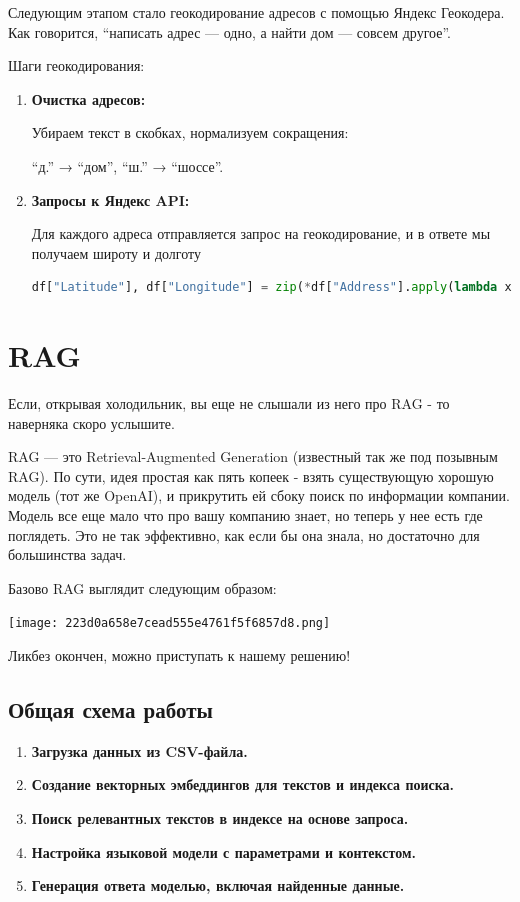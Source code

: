 \documentclass{article}
\begin{document}
Следующим этапом стало геокодирование адресов с помощью Яндекс Геокодера. Как говорится, “написать адрес — одно, а найти дом — совсем другое”.

Шаги геокодирования:
\begin{enumerate}
    \item \textbf{Очистка адресов:}

    Убираем текст в скобках, нормализуем сокращения:

    “д.” → “дом”, “ш.” → “шоссе”.
    
    \item \textbf{Запросы к Яндекс API:}

    Для каждого адреса отправляется запрос на геокодирование, и в ответе мы получаем широту и долготу

        \begin{lstlisting}[language=Python]
df["Latitude"], df["Longitude"] = zip(*df["Address"].apply(lambda x: get_coordinates(x, api_key)))
        \end{lstlisting}
\end{enumerate}







\newpage

\section{RAG}
Если, открывая холодильник, вы еще не слышали из него про RAG - то наверняка скоро услышите.

RAG — это Retrieval-Augmented Generation (известный так же под позывным RAG). По сути, идея простая как пять копеек - взять существующую хорошую модель (тот же OpenAI), и прикрутить ей сбоку поиск по информации компании. Модель все еще мало что про вашу компанию знает, но теперь у нее есть где поглядеть. Это не так эффективно, как если бы она знала, но достаточно для большинства задач.

Базово RAG выглядит следующим образом:

\texttt{[image: 223d0a658e7cead555e4761f5f6857d8.png]}

Ликбез окончен, можно приступать к нашему решению!

\subsection*{Общая схема работы}
\begin{enumerate}
    \item \textbf{Загрузка данных из CSV-файла.}
    \item \textbf{Создание векторных эмбеддингов для текстов и индекса поиска.}
    \item \textbf{Поиск релевантных текстов в индексе на основе запроса.}
    \item \textbf{Настройка языковой модели с параметрами и контекстом.}
    \item \textbf{Генерация ответа моделью, включая найденные данные.}
\end{enumerate}
\end{document}
